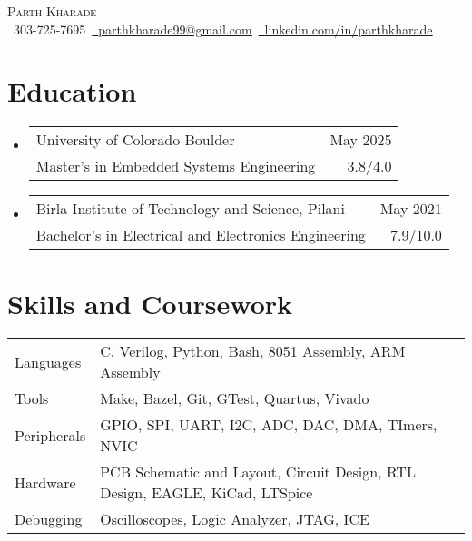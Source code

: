 \documentclass[11pt]{article}
\makeatletter
\newcommand{\resumeSubheadingEdu}[4]{
  \vspace{-2pt}\item
    \begin{tabular*}{1.0\textwidth}[t]{l@{\extracolsep{\fill}}r}
       {\large #1}&{\large #2} \\
       {#3} &{ #4} \\
    \end{tabular*}\vspace{-1pt}
}
\newcommand{\resumeSubHeadingListStart}{\begin{itemize}[leftmargin=0.0in, label={}]}
\newcommand{\resumeSubHeadingListEnd}{\end{itemize}}
\makeatother
\begin{document}
\setlength{\footskip}{4pt}
\begin{center}
  {\huge \scshape Parth Kharade} \\ \vspace{1pt}
  \small \raisebox{-0.1\height}\faPhone\ 303-725-7695{\hspace{0.1cm}}~\href{mailto:parthkharade99@gmail.com}{\raisebox{-0.2\height}\faEnvelope\ \underline{parthkharade99@gmail.com}}~{\hspace{0.1cm}}\href{https://www.linkedin.com/in/parth-k-081287184/}{\raisebox{-0.2\height}\faLinkedin\ \underline{linkedin.com/in/parthkharade}}
  \vspace{-10pt}
\end{center}



\section {Education}
\resumeSubHeadingListStart
\resumeSubheadingEdu
{University of Colorado Boulder}{May 2025}
{Master's in Embedded Systems Engineering}{3.8/4.0}
\vspace{-0.1in}
\resumeSubheadingEdu
{Birla Institute of Technology and Science, Pilani}{May 2021}
{Bachelor's in Electrical and Electronics Engineering}{7.9/10.0}
\resumeSubHeadingListEnd
\vspace{-16pt}
\section{Skills and Coursework}
\vspace{-4mm}
\begin{table}[!htb]
  \begin{tabular} { m{3.1cm} | m{15cm} }
    {Languages}           & {\: C, Verilog, Python, Bash, 8051 Assembly, ARM Assembly}  \\
    {Tools}               & {\: Make, Bazel, Git, GTest, Quartus, Vivado}     \\
    {Peripherals}         & {\: GPIO, SPI, UART, I2C, ADC, DAC, DMA, TImers, NVIC}                 \\
    {Hardware}            & {\: PCB Schematic and Layout, Circuit Design, RTL Design, EAGLE, KiCad, LTSpice}                        \\
    {Debugging}           & {\: Oscilloscopes, Logic Analyzer, JTAG, ICE}\\
  \end{tabular}
\end{table}
\vspace{-16pt}
\end{document}
